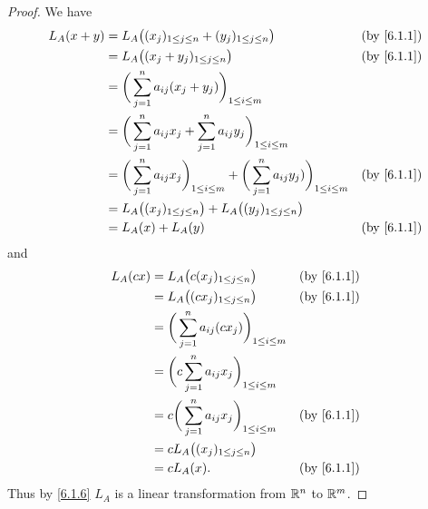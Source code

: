 \begin{proof}
  We have
  \begin{align*}
    L_A(x + y) & = L_A\big((x_j)_{1 \leq j \leq n} + (y_j)_{1 \leq j \leq n}\big)                                                     &  & \text{(by \cref{6.1.1})} \\
               & = L_A\big((x_j + y_j)_{1 \leq j \leq n}\big)                                                                         &  & \text{(by \cref{6.1.1})} \\
               & = \bigg(\sum_{j = 1}^n a_{ij} (x_j + y_j)\bigg)_{1 \leq i \leq m}                                                                                  \\
               & = \bigg(\sum_{j = 1}^n a_{ij} x_j + \sum_{j = 1}^n a_{ij} y_j\bigg)_{1 \leq i \leq m}                                                              \\
               & = \bigg(\sum_{j = 1}^n a_{ij} x_j\bigg)_{1 \leq i \leq m} + \bigg(\sum_{j = 1}^n a_{ij} y_j)\bigg)_{1 \leq i \leq m} &  & \text{(by \cref{6.1.1})} \\
               & = L_A\big((x_j)_{1 \leq j \leq n}\big) + L_A\big((y_j)_{1 \leq j \leq n}\big)                                                                      \\
               & = L_A(x) + L_A(y)                                                                                                    &  & \text{(by \cref{6.1.1})}
  \end{align*}
  and
  \begin{align*}
    L_A(cx) & = L_A\big(c(x_j)_{1 \leq j \leq n}\big)                       &  & \text{(by \cref{6.1.1})} \\
            & = L_A\big((cx_j)_{1 \leq j \leq n}\big)                       &  & \text{(by \cref{6.1.1})} \\
            & = \bigg(\sum_{j = 1}^n a_{ij} (c x_j)\bigg)_{1 \leq i \leq m}                               \\
            & = \bigg(c \sum_{j = 1}^n a_{ij} x_j\bigg)_{1 \leq i \leq m}                                 \\
            & = c \bigg(\sum_{j = 1}^n a_{ij} x_j\bigg)_{1 \leq i \leq m}   &  & \text{(by \cref{6.1.1})} \\
            & = c L_A\big((x_j)_{1 \leq j \leq n}\big)                                                    \\
            & = c L_A(x).                                                   &  & \text{(by \cref{6.1.1})}
  \end{align*}
  Thus by \cref{6.1.6} \(L_A\) is a linear transformation from \(\mathbb{R}^n\) to \(\mathbb{R}^m\).
\end{proof}

